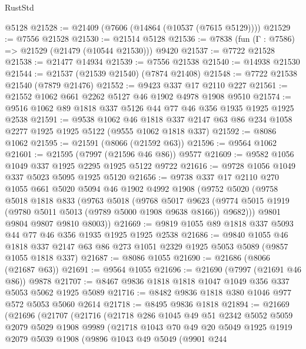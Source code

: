 \begin{lexlean}{RustStd}
\begin{coremodule}
{\begin{coremodule}
{{{{{{{{{{{{{{{{{{{{{{{{{{{{{{{{{{{{{{{{{{{    @5128
@21528 := @21409 (@7606 (@14864 (@10537 (@7615 @5129))))
@21529 := @7556 @21528
@21530 := @21514 @5128
@21536 := @7838 (fun (Γ : @7586) => @21529 (@21479 (@10544 @21530))) @9420
@21537 := @7722 @21528
@21538 := @21477 @14934
@21539 := @7556 @21538
@21540 := @14938 @21530
@21544 := @21537 (@21539 @21540) (@7874 @21408)
@21548 := @7722 @21538 @21540 (@7879 @21476)
@21552 := @9423 @337 @17 @2110 @227
@21561 := @21552 @1062 @661 @2262 @5127 @46 @1902 @4978 @1908 @9510
@21574 := @9516 @1062 @89 @1818 @337 @5126 @44 @77 @46 @356 @1935 @1925 @1925 @2538
@21591 := @9538
    @1062
    @46
    @1818
    @337
    @2147
    @63
    @86
    @234
    @1058
    @2277
    @1925
    @1925
    @5122
    (@9555 @1062 @1818 @337)
@21592 := @8086 @1062
@21595 := @21591 (@8066 (@21592 @63))
@21596 := @9564 @1062
@21601 := @21595 (@7997 (@21596 @46 @86)) @9577
@21609 := @9582 @1056 @1049 @337 @1925 @2295 @1925 @5122 @9722
@21616 := @9728 @1056 @1049 @337 @5023 @5095 @1925 @5120
@21656 := @9738
    @337
    @17
    @2110
    @270
    @1055
    @661
    @5020
    @5094
    @46
    @1902
    @4992
    @1908
    (@9752
      @5020
      (@9758
        @5018
        @1818
        @833
        (@9763
          @5018
          (@9768
            @5017
            @9623
            (@9774 @5015 @1919 (@9780 @5011 @5013 (@9789 @5000 @1908 @9638 @8166)) @9682)))
        @9801
        @9804
        @9807
        @9810
        @8003))
@21669 := @9819 @1055 @89 @1818 @337 @5093 @44 @77 @46 @356 @1935 @1925 @1925 @2538
@21686 := @9840
    @1055
    @46
    @1818
    @337
    @2147
    @63
    @86
    @273
    @1051
    @2329
    @1925
    @5053
    @5089
    (@9857 @1055 @1818 @337)
@21687 := @8086 @1055
@21690 := @21686 (@8066 (@21687 @63))
@21691 := @9564 @1055
@21696 := @21690 (@7997 (@21691 @46 @86)) @9878
@21707 := @8467 @9836 @1818 @1818 @1047 @1049 @356 @337 @5053 @5062 @1925 @5089
@21716 := @8482 @9836 @1818 @380 @1046 @977 @572 @5053 @5060 @2614
@21718 := @8495 @9836 @1818
@21894 := @21669
    (@21696
      (@21707
        (@21716
          (@21718
            @286
            @1045
            @49
            @51
            @2342
            @5052
            @5059
            @2079
            @5029
            @1908
            @9989
            (@21718
              @1043
              @70
              @49
              @20
              @5049
              @1925
              @1919
              @2079
              @5039
              @1908
              (@9896
                @1043
                @49
                @5049
                (@9901
                  @244
}}}}}}}}}}}}}}}}}}}}}}}}}}}}}}}}}}}}}}}}}}}
\end{coremodule}}
\end{coremodule}
\end{lexlean}
